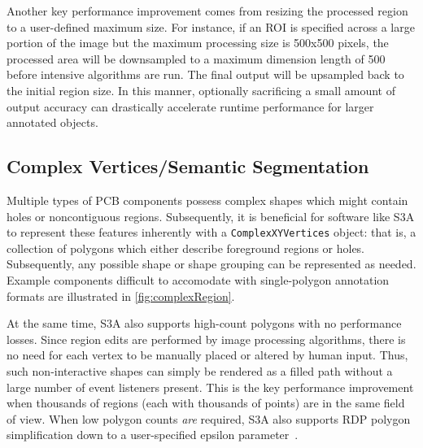 Another key performance improvement comes from resizing the processed region to a user-defined maximum size. For instance, if an ROI is specified across a large portion of the image but the maximum processing size is 500x500 pixels, the processed area will be downsampled to a maximum dimension length of 500 before intensive algorithms are run. The final output will be upsampled back to the initial region size. In this manner, optionally sacrificing a small amount of output accuracy can drastically accelerate runtime performance for larger annotated objects.

\makeRegionEditFig

\subsection{Complex Vertices/Semantic Segmentation}
Multiple types of PCB components possess complex shapes which might contain holes or noncontiguous regions. Subsequently, it is beneficial for software like S3A to represent these features inherently with a \texttt{ComplexXYVertices} object: that is, a collection of polygons which either describe foreground regions or holes. Subsequently, any possible shape or shape grouping can be represented as needed. Example components difficult to accomodate with single-polygon annotation formats are illustrated in \autoref{fig:complexRegion}.

\makeComplexRegionFig

At the same time, S3A also supports high-count polygons with no performance losses. Since region edits are performed by image processing algorithms, there is no need for each vertex to be manually placed or altered by human input. Thus, such non-interactive shapes can simply be rendered as a filled path without a large number of event listeners present. This is the key performance improvement when thousands of regions (each with thousands of points) are in the same field of view. When low polygon counts \emph{are} required, S3A also supports RDP polygon simplification down to a user-specified epsilon parameter~\cite{ramer_iterative_1972}.



